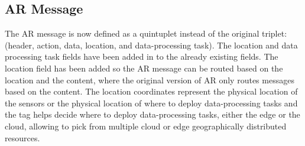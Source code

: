 \subsection{AR Message}
The AR message is now defined as a quintuplet instead of the original triplet: (header, action, data, location, and data-processing task). The location and data processing task fields have been added in to the already existing fields. The location field has been added so the AR message can be routed based on the location and the content, where the original version of AR only routes messages based on the content. The location coordinates represent the physical location of the sensors or the physical location of where to deploy data-processing tasks and the tag helps decide where to deploy data-processing tasks, either the edge or the cloud, allowing to pick from multiple cloud or edge geographically distributed resources.

